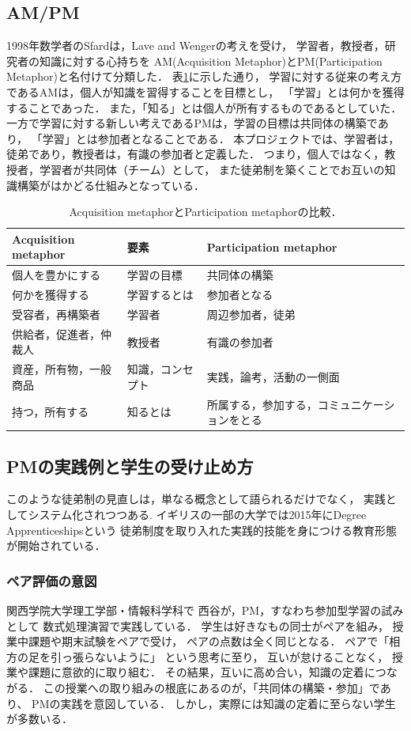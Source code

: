 \documentclass{hissymp}
\begin{document}
\subsection{AM/PM}
\label{sec:org676b915}
1998年数学者のSfardは，Lave and Wengerの考えを受け，
学習者，教授者，研究者の知識に対する心持ちを
AM(Acquisition Metaphor)とPM(Participation Metaphor)と名付けて分類した\cite{Sfard}．
表\ref{tab:org1f91aee}に示した通り，
学習に対する従来の考え方であるAMは，個人が知識を習得することを目標とし，
「学習」とは何かを獲得することであった．
また，「知る」とは個人が所有するものであるとしていた．
一方で学習に対する新しい考えであるPMは，学習の目標は共同体の構築であり，
「学習」とは参加者となることである．
本プロジェクトでは、学習者は，徒弟であり，教授者は，有識の参加者と定義した．
つまり，個人ではなく，教授者，学習者が共同体（チーム）として，
また徒弟制を築くことでお互いの知識構築がはかどる仕組みとなっている．

\begin{table}[bt]
\caption{\label{tab:org1f91aee}
Acquisition metaphorとParticipation metaphorの比較．}
\centering
\begin{tabular}{lll}
\hline
Acquisition metaphor & 要素 & Participation metaphor\\
\hline
個人を豊かにする & 学習の目標 & 共同体の構築\\
何かを獲得する & 学習するとは & 参加者となる\\
受容者，再構築者 & 学習者 & 周辺参加者，徒弟\\
供給者，促進者，仲裁人 & 教授者 & 有識の参加者\\
資産，所有物，一般商品 & 知識，コンセプト & 実践，論考，活動の一側面\\
持つ，所有する & 知るとは & 所属する，参加する，コミュニケーションをとる\\
\hline
\end{tabular}
\end{table}

\subsection{PMの実践例と学生の受け止め方}
\label{sec:org47a634f}
このような徒弟制の見直しは，単なる概念として語られるだけでなく，
実践としてシステム化されつつある.
イギリスの一部の大学では2015年にDegree Apprenticeshipsという
徒弟制度を取り入れた実践的技能を身につける教育形態が開始されている\cite{DegreeApprenticeship}．
\subsubsection{ペア評価の意図}
\label{sec:org2585e85}
関西学院大学理工学部・情報科学科で
西谷が，PM，すなわち参加型学習の試みとして
数式処理演習で実践している．
学生は好きなもの同士がペアを組み，
授業中課題や期末試験をペアで受け，
ペアの点数は全く同じとなる．
ペアで「相方の足を引っ張らないように」
という思考に至り，
互いが怠けることなく，
授業や課題に意欲的に取り組む．
その結果，互いに高め合い，知識の定着につながる．
この授業への取り組みの根底にあるのが，「共同体の構築・参加」であり、
PMの実践を意図している．
しかし，実際には知識の定着に至らない学生が多数いる．
\end{document}
